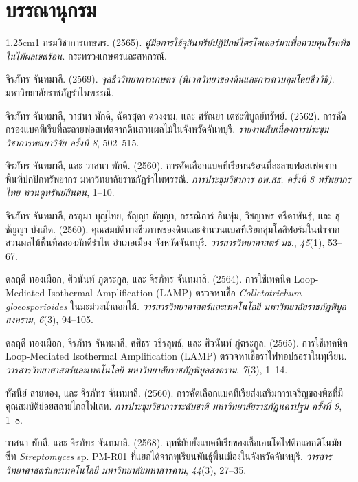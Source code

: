 \chapter*{บรรณานุกรม}

\begin{hangparas}{1.25cm}{1}
กรมวิชาการเกษตร. (2565). \textit{คู่มือการใช้จุลินทรีย์ปฏิปักษ์ไตรโคเดอร์มาเพื่อควบคุมโรคพืชในไม้ผลเขตร้อน}. กระทรวงเกษตรและสหกรณ์.

จิรภัทร จันทมาลี. (2569). \textit{จุลชีววิทยาการเกษตร (นิเวศวิทยาของดินและการควบคุมโดยชีววิธี)}. มหาวิทยาลัยราชภัฏรำไพพรรณี.

จิรภัทร จันทมาลี, วาสนา พักดี, ฉัตรสุดา ดวงงาม, และ ศรัณยา เตชะพิบูลย์ทรัพย์. (2562). การคัดกรองแบคทีเรียที่ละลายฟอสเฟตจากดินสวนผลไม้ในจังหวัดจันทบุรี. \textit{รายงานสืบเนื่องการประชุมวิชาการพะเยาวิจัย ครั้งที่ 8}, 502--515.

จิรภัทร จันทมาลี, และ วาสนา พักดี. (2560). การคัดเลือกแบคทีเรียทนร้อนที่ละลายฟอสเฟตจากพื้นที่ปกปักทรัพยากร มหาวิทยาลัยราชภัฏรำไพพรรณี. \textit{การประชุมวิชาการ อพ.สธ. ครั้งที่ 8 ทรัพยากรไทย หวนดูทรัพย์สินตน}, 1--10.

จิรภัทร จันทมาลี, อรอุมา บุญไทย, ธัญญา ธัญญา, กรรณิการ์ อินทุ่ม, วิชญาพร ศรีดาพันธุ์, และ สุชัญญา บังเกิด. (2560). คุณสมบัติทางชีวภาพของดินและจำนวนแบคทีเรียกลุ่มโคลิฟอร์มในน้ำจากสวนผลไม้พื้นที่คลองภักดีรำไพ อำเภอเมือง จังหวัดจันทบุรี. \textit{วารสารวิทยาศาสตร์ มข.}, \textit{45}(1), 53--67.

ดลฤดี ทองเผือก, ศิวนันท์ ภู่ตระกูล, และ จิรภัทร จันทมาลี. (2564). การใช้เทคนิค Loop-Mediated Isothermal Amplification (LAMP) ตรวจหาเชื้อ \textit{Colletotrichum gloeosporioides} ในมะม่วงน้ำดอกไม้. \textit{วารสารวิทยาศาสตร์และเทคโนโลยี มหาวิทยาลัยราชภัฏพิบูลสงคราม}, \textit{6}(3), 94--105.

ดลฤดี ทองเผือก, จิรภัทร จันทมาลี, ศศิธร วชิรลุพธ์, และ ศิวนันท์ ภู่ตระกูล. (2565). การใช้เทคนิค Loop-Mediated Isothermal Amplification (LAMP) ตรวจหาเชื้อราไฟทอปธอราในทุเรียน. \textit{วารสารวิทยาศาสตร์และเทคโนโลยี มหาวิทยาลัยราชภัฏพิบูลสงคราม}, \textit{7}(3), 1--14.

ทัศนีย์ สายทอง, และ จิรภัทร จันทมาลี. (2560). การคัดเลือกแบคทีเรียส่งเสริมการเจริญของพืชที่มีคุณสมบัติย่อยสลายไกลโฟเสท. \textit{การประชุมวิชาการระดับชาติ มหาวิทยาลัยราชภัฏนครปฐม ครั้งที่ 9}, 1--8.

วาสนา พักดี, และ จิรภัทร จันทมาลี. (2568). ฤทธิ์ยับยั้งแบคทีเรียของเชื้อเอนโดไฟติกแอกติโนมัยซีท \textit{Streptomyces} sp. PM-R01 ที่แยกได้จากทุเรียนพันธุ์พื้นเมืองในจังหวัดจันทบุรี. \textit{วารสารวิทยาศาสตร์และเทคโนโลยี มหาวิทยาลัยมหาสารคาม}, \textit{44}(3), 27--35.


\end{hangparas}

